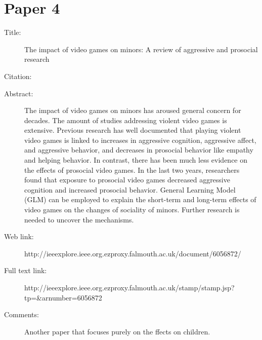 \documentclass{scrartcl}
\begin{document}
\section*{Paper 4}
\begin{description}
\item[Title:] The impact of video games on minors: A review of aggressive and prosocial research
\item[Citation:] \cite{review}
\item[Abstract:] The impact of video games on minors has aroused general concern for decades. The amount of studies addressing violent video games is extensive. Previous research has well documented that playing violent video games is linked to increases in aggressive cognition, aggressive affect, and aggressive behavior, and decreases in prosocial behavior like empathy and helping behavior. In contrast, there has been much less evidence on the effects of prosocial video games. In the last two years, researchers found that exposure to prosocial video games decreased aggressive cognition and increased prosocial behavior. General Learning Model (GLM) can be employed to explain the short-term and long-term effects of video games on the changes of sociality of minors. Further research is needed to uncover the mechanisms.
\item[Web link:] http://ieeexplore.ieee.org.ezproxy.falmouth.ac.uk/document/6056872/
\item[Full text link:] http://ieeexplore.ieee.org.ezproxy.falmouth.ac.uk/stamp/stamp.jsp?tp=&arnumber=6056872
\item[Comments:] Another paper that focuses purely on the ffects on children. 
\end{description}
\end{document}

